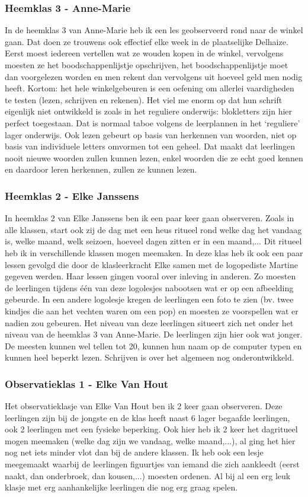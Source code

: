 \documentclass[a4paper,11pt]{article}
\theoremstyle{definition}
\begin{document}
\subsubsection{Heemklas 3 - Anne-Marie}
In de heemklas 3 van Anne-Marie heb ik een les geobserveerd rond naar de winkel 
gaan. Dat doen ze trouwens ook effectief elke week in de plaatselijke Delhaize. Eerst moest iedereen vertellen wat ze wouden kopen in de winkel, vervolgens moesten ze het boodschappenlijstje 
opschrijven, het boodschappenlijstje moet dan voorgelezen worden en men rekent dan vervolgens uit 
hoeveel geld men nodig heeft. Kortom: het hele winkelgebeuren is een oefening om 
allerlei vaardigheden te testen (lezen, schrijven en rekenen). Het viel me enorm 
op dat hun schrift eigenlijk niet ontwikkeld is zoals in het reguliere 
onderwijs: blokletters zijn hier perfect toegestaan. Dat is normaal taboe volgens de leerplannen in het `reguliere' lager onderwijs.
Ook lezen gebeurt op basis 
van herkennen van woorden, niet op basis van individuele letters omvormen tot 
een geheel. Dat maakt dat leerlingen nooit nieuwe woorden zullen kunnen lezen, 
enkel woorden die ze echt goed kennen en daardoor leren herkennen, zullen ze kunnen lezen. 

\subsubsection{Heemklas 2 - Elke Janssens}
In heemklas 2 van Elke Janssens ben ik een paar keer gaan observeren. Zoals in 
alle klassen, start ook zij de dag met een heus ritueel rond welke dag het vandaag is, welke maand, welk seizoen, hoeveel dagen zitten er in een maand,... Dit 
ritueel heb ik in verschillende klassen mogen meemaken. In deze klas heb ik ook 
een paar lessen gevolgd die door de klasleerkracht Elke samen met de logopediste 
Martine gegeven werden. Haar lessen gingen vooral over inleving in anderen. Zo 
moesten de leerlingen tijdens één van deze logolesjes nabootsen wat er op een 
afbeelding gebeurde. In een andere logolesje kregen de leerlingen een foto te zien (bv. twee kindjes die aan het vechten waren om een pop) 
en moesten ze voorspellen wat er nadien zou gebeuren. Het niveau van deze leerlingen 
situeert zich net onder het niveau van de heemklas 3 van Anne-Marie. De 
leerlingen zijn hier ook wat jonger. De meesten kunnen wel tellen tot
20, kunnen hun naam op de computer typen en kunnen heel beperkt lezen. Schrijven 
is over het algemeen nog onderontwikkeld.
\subsubsection{Observatieklas 1 - Elke Van Hout}
Het observatieklasje van Elke Van Hout ben ik 2 keer gaan observeren. Deze 
leerlingen zijn bij de jongste en de klas heeft naast 6 lager begaafde 
leerlingen, ook 2 leerlingen met een fysieke beperking. Ook hier heb ik 2 keer 
het dagritueel mogen meemaken (welke dag zijn we vandaag, welke maand,...), al 
ging het hier nog net iets minder vlot dan bij de andere klassen. Ik heb ook een 
lesje meegemaakt waarbij de leerlingen figuurtjes van iemand die zich aankleedt (eerst naakt, dan onderbroek, dan kousen,...) 
moesten ordenen. Al bij al een erg leuk klasje met erg aanhankelijke leerlingen 
die nog erg graag spelen.
\end{document}
